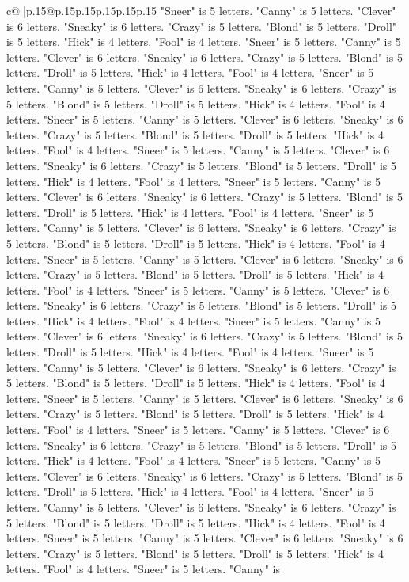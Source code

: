 \documentclass{article}
\begin{document}
{\begin{supertabular}{c@{$\;$}|p{.15\linewidth}@{}p{.15\linewidth}p{.15\linewidth}p{.15\linewidth}p{.15\linewidth}p{.15\linewidth}}
{{{"Sneer" is 5 letters. "Canny" is 5 letters. "Clever" is 6 letters. "Sneaky" is 6 letters. "Crazy" is 5 letters. "Blond" is 5 letters. "Droll" is 5 letters. "Hick" is 4 letters. "Fool" is 4 letters. "Sneer" is 5 letters. "Canny" is 5 letters. "Clever" is 6 letters. "Sneaky" is 6 letters. "Crazy" is 5 letters. "Blond" is 5 letters. "Droll" is 5 letters. "Hick" is 4 letters. "Fool" is 4 letters. "Sneer" is 5 letters. "Canny" is 5 letters. "Clever" is 6 letters. "Sneaky" is 6 letters. "Crazy" is 5 letters. "Blond" is 5 letters. "Droll" is 5 letters. "Hick" is 4 letters. "Fool" is 4 letters. "Sneer" is 5 letters. "Canny" is 5 letters. "Clever" is 6 letters. "Sneaky" is 6 letters. "Crazy" is 5 letters. "Blond" is 5 letters. "Droll" is 5 letters. "Hick" is 4 letters. "Fool" is 4 letters. "Sneer" is 5 letters. "Canny" is 5 letters. "Clever" is 6 letters. "Sneaky" is 6 letters. "Crazy" is 5 letters. "Blond" is 5 letters. "Droll" is 5 letters. "Hick" is 4 letters. "Fool" is 4 letters. "Sneer" is 5 letters. "Canny" is 5 letters. "Clever" is 6 letters. "Sneaky" is 6 letters. "Crazy" is 5 letters. "Blond" is 5 letters. "Droll" is 5 letters. "Hick" is 4 letters. "Fool" is 4 letters. "Sneer" is 5 letters. "Canny" is 5 letters. "Clever" is 6 letters. "Sneaky" is 6 letters. "Crazy" is 5 letters. "Blond" is 5 letters. "Droll" is 5 letters. "Hick" is 4 letters. "Fool" is 4 letters. "Sneer" is 5 letters. "Canny" is 5 letters. "Clever" is 6 letters. "Sneaky" is 6 letters. "Crazy" is 5 letters. "Blond" is 5 letters. "Droll" is 5 letters. "Hick" is 4 letters. "Fool" is 4 letters. "Sneer" is 5 letters. "Canny" is 5 letters. "Clever" is 6 letters. "Sneaky" is 6 letters. "Crazy" is 5 letters. "Blond" is 5 letters. "Droll" is 5 letters. "Hick" is 4 letters. "Fool" is 4 letters. "Sneer" is 5 letters. "Canny" is 5 letters. "Clever" is 6 letters. "Sneaky" is 6 letters. "Crazy" is 5 letters. "Blond" is 5 letters. "Droll" is 5 letters. "Hick" is 4 letters. "Fool" is 4 letters. "Sneer" is 5 letters. "Canny" is 5 letters. "Clever" is 6 letters. "Sneaky" is 6 letters. "Crazy" is 5 letters. "Blond" is 5 letters. "Droll" is 5 letters. "Hick" is 4 letters. "Fool" is 4 letters. "Sneer" is 5 letters. "Canny" is 5 letters. "Clever" is 6 letters. "Sneaky" is 6 letters. "Crazy" is 5 letters. "Blond" is 5 letters. "Droll" is 5 letters. "Hick" is 4 letters. "Fool" is 4 letters. "Sneer" is 5 letters. "Canny" is 5 letters. "Clever" is 6 letters. "Sneaky" is 6 letters. "Crazy" is 5 letters. "Blond" is 5 letters. "Droll" is 5 letters. "Hick" is 4 letters. "Fool" is 4 letters. "Sneer" is 5 letters. "Canny" is 5 letters. "Clever" is 6 letters. "Sneaky" is 6 letters. "Crazy" is 5 letters. "Blond" is 5 letters. "Droll" is 5 letters. "Hick" is 4 letters. "Fool" is 4 letters. "Sneer" is 5 letters. "Canny" is 5 letters. "Clever" is 6 letters. "Sneaky" is 6 letters. "Crazy" is 5 letters. "Blond" is 5 letters. "Droll" is 5 letters. "Hick" is 4 letters. "Fool" is 4 letters. "Sneer" is 5 letters. "Canny" is 5 letters. "Clever" is 6 letters. "Sneaky" is 6 letters. "Crazy" is 5 letters. "Blond" is 5 letters. "Droll" is 5 letters. "Hick" is 4 letters. "Fool" is 4 letters. "Sneer" is 5 letters. "Canny" is }}}
\end{supertabular}}
\end{document}
